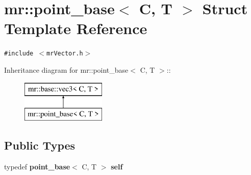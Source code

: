 \section{mr::point\_\-base$<$ C, T $>$ Struct Template Reference}
\label{structmr_1_1point__base}
{\tt \#include $<$mr\-Vector.h$>$}

Inheritance diagram for mr::point\_\-base$<$ C, T $>$::\begin{figure}[H]
\begin{center}
\leavevmode
\includegraphics[height=2cm]{structmr_1_1point__base}
\end{center}
\end{figure}
\subsection*{Public Types}
\begin{CompactItemize}
\item 
typedef {\bf point\_\-base}$<$ C, T $>$ {\bf self}
\end{CompactItemize}
